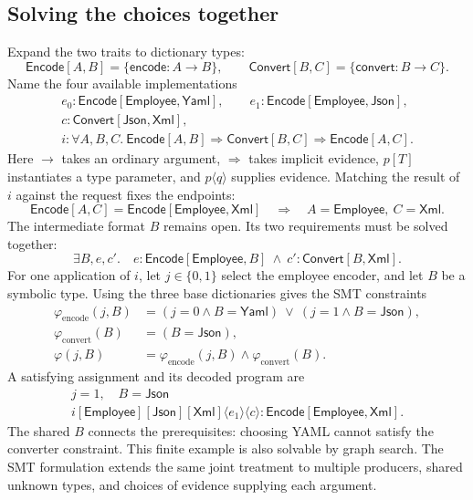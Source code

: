 \documentclass[10pt,a4paper]{article}
\newcommand{\iarg}[1]{\langle#1\rangle}
\newcommand{\kw}[1]{\mathsf{#1}}
\begin{document}
\subsection{Solving the choices together}
Expand the two traits to dictionary types:
\[
 \kw{Encode}[A,B]=\{\kw{encode}:A\to B\},\qquad
 \kw{Convert}[B,C]=\{\kw{convert}:B\to C\}.
\]
Name the four available implementations
\[
\begin{gathered}
 e_0:\kw{Encode}[\kw{Employee},\kw{Yaml}],\qquad
 e_1:\kw{Encode}[\kw{Employee},\kw{Json}],\\
 c:\kw{Convert}[\kw{Json},\kw{Xml}],\\
 i:\forall A,B,C.\ \kw{Encode}[A,B]\Rightarrow\kw{Convert}[B,C]
                   \Rightarrow\kw{Encode}[A,C].
\end{gathered}
\]
Here $\to$ takes an ordinary argument, $\Rightarrow$ takes implicit evidence,
$p[T]$ instantiates a type parameter, and $p\iarg{q}$ supplies evidence.
Matching the result of $i$ against the request fixes the endpoints:
\[
 \kw{Encode}[A,C]=\kw{Encode}[\kw{Employee},\kw{Xml}]
 \quad\Longrightarrow\quad A=\kw{Employee},\ C=\kw{Xml}.
\]
The intermediate format $B$ remains open. Its two requirements must be solved together:
\[
 \boxed{\exists B,e,c'.\quad
   e:\kw{Encode}[\kw{Employee},B]\ \land\ c':\kw{Convert}[B,\kw{Xml}].}
\]
For one application of $i$, let $j\in\{0,1\}$ select the employee encoder,
and let $B$ be a symbolic type. Using the three base dictionaries gives the
SMT constraints
\[
\begin{aligned}
 \varphi_{\mathrm{encode}}(j,B)
   &=(j=0\land B=\kw{Yaml})\ \lor\ (j=1\land B=\kw{Json}),\\
 \varphi_{\mathrm{convert}}(B)&=(B=\kw{Json}),\\
 \varphi(j,B)&=\varphi_{\mathrm{encode}}(j,B)\land
               \varphi_{\mathrm{convert}}(B).
\end{aligned}
\]
A satisfying assignment and its decoded program are
\[
\begin{gathered}
 \boxed{j=1,\quad B=\kw{Json}}\\[4pt]
 \boxed{i[\kw{Employee}][\kw{Json}][\kw{Xml}]\iarg{e_1}\iarg{c}
        :\kw{Encode}[\kw{Employee},\kw{Xml}].}
\end{gathered}
\]
The shared $B$ connects the prerequisites: choosing YAML cannot satisfy the
converter constraint. This finite example is also solvable by graph search.
The SMT formulation extends the same joint treatment to multiple producers,
shared unknown types, and choices of evidence supplying each argument.
\end{document}
